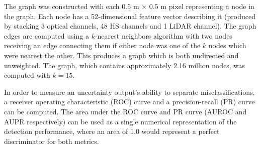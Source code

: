 \documentclass[
twocolumn,
]{ceurart}
\begin{document}
The graph was constructed with each $0.5$ m $\times$ $0.5$ m pixel representing a node in the graph.
Each node has a 52-dimensional feature vector describing it (produced by stacking 3 optical channels, 48 HS channels and 1 LiDAR channel).
The graph edges are computed using a $k$-nearest neighbors algorithm with two nodes receiving an edge connecting them if either node was one of the $k$ nodes which were nearest the other.
This produces a graph which is both undirected and unweighted.
The graph, which contains approximately 2.16 million nodes, was computed with $k=15$.

In order to measure an uncertainty output's ability to separate misclassifications, a receiver operating characteristic (ROC) curve and a precision-recall (PR) curve can be computed.
The area under the ROC curve and PR curve (AUROC and AUPR respectively) can be used as a single numerical representation of the detection performance, where an area of $1.0$ would represent a perfect discriminator for both metrics.

\end{document}
